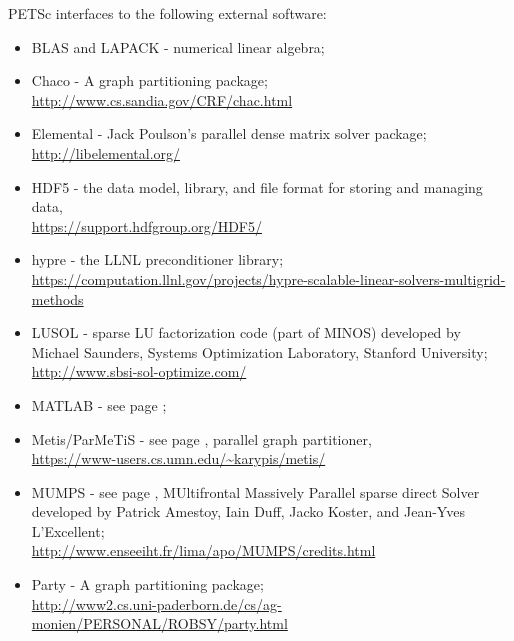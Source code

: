 \vspace{.3in}
\noindent
PETSc interfaces to the following external software:
\begin{itemize}
  \item BLAS and LAPACK - numerical linear algebra;
  \item Chaco - A graph partitioning package;\\\href{http://www.cs.sandia.gov/CRF/chac.html}{http://www.cs.sandia.gov/CRF/chac.html}
  \item Elemental -  Jack Poulson's parallel dense matrix solver package;\\\href{http://libelemental.org/}{http://libelemental.org/}
  \item HDF5 - the data model, library, and file format for storing and managing data,\\\href{https://support.hdfgroup.org/HDF5/}{https://support.hdfgroup.org/HDF5/}
  \item hypre -    the LLNL preconditioner library;\\\href{https://computation.llnl.gov/projects/hypre-scalable-linear-solvers-multigrid-methods}{https://computation.llnl.gov/projects/hypre-scalable-linear-solvers-multigrid-methods}
  \item LUSOL -       sparse LU factorization code (part of MINOS) developed by Michael Saunders,
                      Systems Optimization Laboratory, Stanford University;\\
                     \href{http://www.sbsi-sol-optimize.com/}{http://www.sbsi-sol-optimize.com/}
  \item MATLAB -      see page \pageref{ch_matlab};
  \item Metis/ParMeTiS - see page \pageref{sec_partitioning}, parallel graph partitioner,\\
                     \href{https://www-users.cs.umn.edu/~karypis/metis/}{https://www-users.cs.umn.edu/\~{}karypis/metis/}
  \item MUMPS -      see page \pageref{sec_externalsol}, MUltifrontal Massively Parallel sparse direct Solver developed by Patrick Amestoy,
                     Iain Duff, Jacko Koster, and Jean-Yves L'Excellent; \\
                     \href{http://www.enseeiht.fr/lima/apo/MUMPS/credits.html}{http://www.enseeiht.fr/lima/apo/MUMPS/credits.html}
  \item Party -     A graph partitioning package; \\ 
               \href{http://www2.cs.uni-paderborn.de/cs/ag-monien/PERSONAL/ROBSY/party.html}{http://www2.cs.uni-paderborn.de/cs/ag-monien/PERSONAL/ROBSY/party.html}

\end{itemize}
